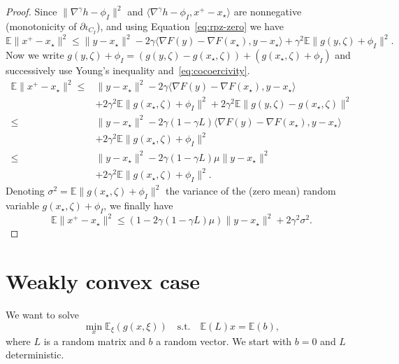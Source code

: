 \documentclass{article}
\newcommand{\1}{\mathbbm 1}
\newcommand{\bE}{{{\mathbb E}}}
\newcommand{\ps}[1]{\langle #1 \rangle}
\theoremstyle{definition}
\begin{document}
\begin{proof}
Since $\|\nabla ^\gamma h - \phi_I\|^2$ and $\ps{\nabla ^\gamma h - \phi_I,x^+-x_\star}$ are nonnegative (monotonicity of $\partial \iota_{C_I}$), and using Equation~\eqref{eq:rpz-zero} we have
\begin{equation*}
    \bE \|x^+ - x_\star\|^2 \leq \|y - x_\star\|^2 -2\gamma \ps{\nabla F(y) - \nabla F(x_\star),y-x_\star} + \gamma^2 \bE \|g(y,\zeta) + \phi_I\|^2.
\end{equation*}
Now we write $g(y,\zeta) + \phi_I = (g(y,\zeta) - g(x_\star,\zeta)) + (g(x_\star,\zeta) + \phi_I)$ and successively use Young's inequality and~\eqref{eq:cocoercivity}.
\begin{align*}
    \bE \|x^+ - x_\star\|^2 \leq& \|y - x_\star\|^2 -2\gamma \ps{\nabla F(y) - \nabla F(x_\star),y-x_\star}\\
    &+ 2\gamma^2 \bE \|g(x_\star,\zeta) + \phi_I\|^2 + 2\gamma^2 \bE\|g(y,\zeta) - g(x_\star,\zeta)\|^2\\
    \leq& \|y - x_\star\|^2 -2\gamma(1-\gamma L) \ps{\nabla F(y) - \nabla F(x_\star),y-x_\star}\\
    &+ 2\gamma^2 \bE \|g(x_\star,\zeta) + \phi_I\|^2\\
    \leq& \|y - x_\star\|^2 -2\gamma(1-\gamma L)\mu \|y-x_\star\|^2\\
    &+ 2\gamma^2 \bE \|g(x_\star,\zeta) + \phi_I\|^2.
\end{align*}
Denoting $\sigma^2 = \bE \|g(x_\star,\zeta) + \phi_I\|^2$ the variance of the (zero mean) random variable $g(x_\star,\zeta) + \phi_I$, we finally have
\begin{equation}
\label{eq:linear-neighborhood-rpsg}
    \bE \|x^+ - x_\star\|^2 \leq (1-2\gamma(1-\gamma L)\mu)\|y - x_\star\|^2 + 2\gamma^2 \sigma^2. 
\end{equation}
\end{proof}

\section{Weakly convex case}


We want to solve 
\begin{equation}
    \min_x \bE_\xi(g(x,\xi)) \quad\text{s.t.}\quad \bE(L)x = \bE(b),
\end{equation}
where $L$ is a random matrix and $b$ a random vector. We start with $b = 0$ and $L$ deterministic. 
\end{document}
